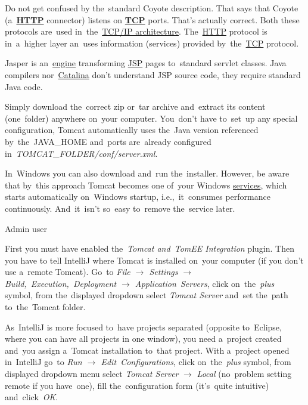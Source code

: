 \warning Do not get confused by the~standard Coyote description.
That says that Coyote (a~\hyperref[http]{\textbf{HTTP}} connector) listens on \hyperref[tcp]{\textbf{TCP}} ports.
That's actually correct.
Both these protocols are~used in~the~\hyperref[tcpip]{TCP/IP architecture}.
The~\hyperref[http]{HTTP} protocol is in~a~higher layer an~uses information (services) provided by~the~\hyperref[tcp]{TCP} protocol.

Jasper is an~\hyperref[engine]{engine} transforming \hyperref[jsp]{JSP} pages to~standard servlet classes.
Java compilers nor~\hyperref[catalina]{Catalina} don't understand JSP source code, they require standard Java code.

Simply download the~correct zip or~tar archive and~extract its content (one~folder) anywhere on~your computer.
You~don't have to~set~up any special configuration, Tomcat automatically uses the~Java version referenced by~the~JAVA\_HOME and~ports are~already configured in~\textit{TOMCAT\_FOLDER/conf/server.xml}.

\warning In~Windows you can also download and~run the~installer.
However, be aware that by~this approach Tomcat becomes one of~your Windows \hyperref[applicationprocessprogramservicethread]{services}, which starts automatically on~Windows startup, i.e.,~it~consumes performance continuously.
And~it~isn't so~easy to~remove the~service later.

\todo Admin user




First you must have enabled the~\textit{Tomcat and~TomEE Integration} plugin.
Then you have to tell IntelliJ where Tomcat is installed on~your computer (if you don't use a~remote Tomcat).
Go~to \textit{File $\rightarrow$ Settings $\rightarrow$ Build,~Execution,~Deployment $\rightarrow$ Application~Servers}, click on~the~\textit{plus} symbol, from the~displayed dropdown select \textit{Tomcat Server} and~set the~path to~the~Tomcat folder.

As~IntelliJ is more focused to~have projects separated (opposite to~Eclipse, where you can have all projects in one window), you need a~project created and~you assign a~Tomcat installation to~that project.
With a~project opened in~IntelliJ go~to \textit{Run $\rightarrow$ Edit~Configurations}, click on~the~\textit{plus} symbol, from displayed dropdown menu select \textit{Tomcat Server} $\rightarrow$ \textit{Local} (no~problem setting remote if you have~one), fill the~configuration form (it's~quite intuitive) and~click~\textit{OK}.

